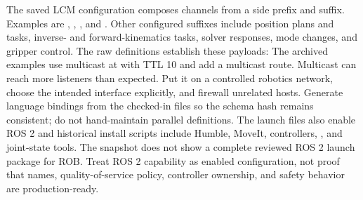 {}The saved LCM configuration composes channels from a side prefix and suffix. Examples are , , , and . Other configured suffixes include position plans and tasks, inverse- and forward-kinematics tasks, solver responses, mode changes, and gripper control.\markdownRendererParagraphSeparator
{}The raw definitions establish these payloads:\markdownRendererInterblockSeparator
{}\markdownRendererInterblockSeparator
{}The archived examples use multicast at  with TTL 10 and add a multicast route. Multicast can reach more listeners than expected. Put it on a controlled robotics network, choose the intended interface explicitly, and firewall unrelated hosts. Generate language bindings from the checked-in  files so the schema hash remains consistent; do not hand-maintain parallel definitions.\markdownRendererParagraphSeparator
{}The launch files also enable ROS 2 and historical install scripts include Humble, MoveIt, controllers, , and joint-state tools. The snapshot does not show a complete reviewed ROS 2 launch package for ROB. Treat ROS 2 capability as enabled configuration, not proof that names, quality-of-service policy, controller ownership, and safety behavior are production-ready.\markdownRendererInterblockSeparator
{}
\markdownRendererSectionEnd \markdownRendererSectionBegin
